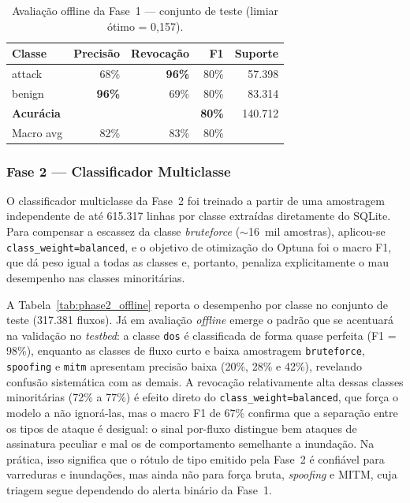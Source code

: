 \documentclass[12pt]{article}
\begin{document}
\begin{table}[ht]
\centering
\caption{Avaliação offline da Fase~1 — conjunto de teste (limiar ótimo = 0,157).}
\label{tab:phase1_offline}
\begin{tabular}{@{}lrrrr@{}}
\toprule
\textbf{Classe} & \textbf{Precisão} & \textbf{Revocação} & \textbf{F1} & \textbf{Suporte} \\ \midrule
attack  & 68\% & \textbf{96\%} & 80\% & 57.398 \\
benign  & \textbf{96\%} & 69\% & 80\% & 83.314 \\ \midrule
\textbf{Acurácia} & & & \textbf{80\%} & 140.712 \\
Macro avg & 82\% & 83\% & 80\% & \\
\bottomrule
\end{tabular}
\end{table}

\subsubsection{Fase 2 — Classificador Multiclasse}

O classificador multiclasse da Fase~2 foi treinado a partir de uma
amostragem independente de até 615.317 linhas por classe extraídas diretamente do
SQLite. Para compensar a escassez da classe \textit{bruteforce}
($\sim$16~mil amostras), aplicou-se \texttt{class\_weight=balanced}, e o objetivo
de otimização do Optuna foi o macro F1, que dá peso igual a todas as classes e,
portanto, penaliza explicitamente o mau desempenho nas classes minoritárias.

A Tabela~\ref{tab:phase2_offline} reporta o desempenho por classe no conjunto de
teste (317.381 fluxos). Já em avaliação \textit{offline} emerge o padrão que se
acentuará na validação no \textit{testbed}: a classe \texttt{dos} é classificada de forma
quase perfeita (F1 = 98\%), enquanto as classes de fluxo curto e baixa amostragem
\texttt{bruteforce}, \texttt{spoofing} e \texttt{mitm} apresentam precisão baixa
(20\%, 28\% e 42\%), revelando confusão sistemática com as demais. A revocação
relativamente alta dessas classes minoritárias (72\% a 77\%) é efeito direto do
\texttt{class\_weight=balanced}, que força o modelo a não ignorá-las, mas o macro
F1 de 67\% confirma que a separação entre os tipos de ataque é desigual: o sinal
por-fluxo distingue bem ataques de assinatura peculiar e mal os de comportamento
semelhante a inundação. Na prática, isso significa que o rótulo de tipo emitido
pela Fase~2 é confiável para varreduras e inundações, mas ainda não para força
bruta, \textit{spoofing} e MITM, cuja triagem segue dependendo do alerta binário
da Fase~1.
\end{document}
